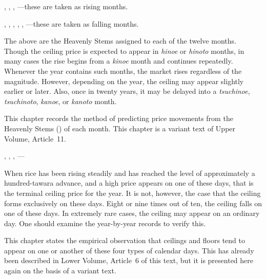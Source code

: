\begin{sokyubox}
{\small\itshape\color{sokyubar} }

\medskip
{}, , ,
---these are taken as rising months.

, , ,
, ,
---these are taken as falling months.

The above are the Heavenly Stems assigned to each of the twelve months.
Though the ceiling price is expected to appear in \textit{hinoe} or
\textit{hinoto} months, in many cases the rise begins from a
\textit{kinoe} month and continues repeatedly. Whenever the year contains
such months, the market rises regardless of the magnitude. However,
depending on the year, the ceiling may appear slightly earlier or later.
Also, once in twenty years, it may be delayed into a \textit{tsuchinoe},
\textit{tsuchinoto}, \textit{kanoe}, or \textit{kanoto} month.
\end{sokyubox}

\commentary
This chapter records the method of predicting price movements from the
Heavenly Stems () of each month. This chapter is a
variant text of Upper Volume, Article~11.


\begin{sokyubox}
{\small\itshape\color{sokyubar} }

\medskip
{}, ,
, ---

When rice has been rising steadily and has reached the level of
approximately a hundred-tawara advance, and a high price appears on one
of these days, that is the terminal ceiling price for the year. It is not,
however, the case that the ceiling forms exclusively on these days. Eight
or nine times out of ten, the ceiling falls on one of these days. In
extremely rare cases, the ceiling may appear on an ordinary day. One
should examine the year-by-year records to verify this.
\end{sokyubox}

\commentary
This chapter states the empirical observation that ceilings and floors tend
to appear on one or another of these four types of calendar days. This has
already been described in Lower Volume, Article~6 of this text, but it is
presented here again on the basis of a variant text.

